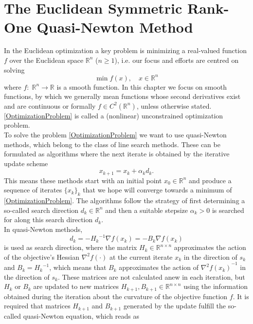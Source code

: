 \chapter{The Euclidean Symmetric Rank-One Quasi-Newton Method}

In the Euclidean optimization a key problem is minimizing a real-valued function $f$ over the Euclidean space $\mathbb{R}^n$ ($n \geq 1$), i.e. our focus and efforts are centred on solving 
\begin{equation}\label{OptimizationProblem}
    \min f(x), \quad x \in \mathbb{R}^n
\end{equation}  
where $f \colon \; \mathbb{R}^n \to \mathbb{R}$ is a smooth function. In this chapter we focus on smooth functions, by which we generally mean functions whose second derivatives exist and are continuous or formally $f \in C^2(\mathbb{R}^n)$, unless otherwise stated. \cref{OptimizationProblem} is called a (nonlinear) unconstrained optimization problem. \\
To solve the problem \cref{OptimizationProblem} we want to use quasi-Newton methods, which belong to the class of line search methods. These can be formulated as algorithms where the next iterate is obtained by the iterative update scheme
\begin{equation}\label{IterativeUpdateScheme}
    x_{k+1} = x_k + \alpha_k d_k.
\end{equation}
This means these methods start with an initial point $x_0 \in \mathbb{R}^n$ and produce a sequence of iterates $\{x_k\}_k$ that we hope will converge towards a minimum of \cref{OptimizationProblem}. The algorithms follow the strategy of first determining a so-called search direction $d_k \in \mathbb{R}^n$ and then a suitable stepsize $\alpha_k > 0$ is searched for along this search direction $d_k$. \\
In quasi-Newton methods, 
\begin{equation*}
    d_k = -{H_k}^{-1} \nabla f(x_k) = -B_k \nabla f(x_k)
\end{equation*}
is used as search direction, where the matrix $H_k \in \mathbb{R}^{n \times n}$ approximates the action of the objective's Hessian $\nabla^{2} f(\cdot)$ at the current iterate $x_k$ in the direction of $s_k$ and $B_k = {H_k}^{-1}$, which means that $B_k$ approximates the action of ${\nabla^{2} f(x_k)}^{-1}$ in the direction of $s_k$. These matrices are not calculated anew in each iteration, but $H_k$ or $B_k$ are updated to new matrices $H_{k+1}, B_{k+1} \in \mathbb{R}^{n \times n}$ using the information obtained during the iteration about the curvature of the objective function $f$. It is required that matrices $H_{k+1}$ and $B_{k+1}$ generated by the update fulfill the so-called quasi-Newton equation, which reads as 
